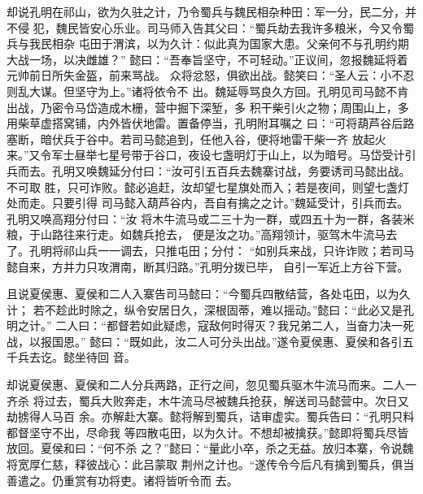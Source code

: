 却说孔明在祁山，欲为久驻之计，乃令蜀兵与魏民相杂种田：军一分，民二分，并不侵
犯，魏民皆安心乐业。司马师入告其父曰：“蜀兵劫去我许多粮米，今又令蜀兵与我民相杂
屯田于渭滨，以为久计：似此真为国家大患。父亲何不与孔明约期大战一场，以决雌雄？”
懿曰：“吾奉旨坚守，不可轻动。”正议间，忽报魏延将着元帅前日所失金盔，前来骂战。
众将忿怒，俱欲出战。懿笑曰：“圣人云：小不忍则乱大谋。但坚守为上。”诸将依令不
出。魏延辱骂良久方回。孔明见司马懿不肯出战，乃密令马岱造成木栅，营中掘下深堑，多
积干柴引火之物；周围山上，多用柴草虚搭窝铺，内外皆伏地雷。置备停当，孔明附耳嘱之
曰：“可将葫芦谷后路塞断，暗伏兵于谷中。若司马懿追到，任他入谷，便将地雷干柴一齐
放起火来。”又令军士昼举七星号带于谷口，夜设七盏明灯于山上，以为暗号。马岱受计引
兵而去。孔明又唤魏延分付曰：“汝可引五百兵去魏寨讨战，务要诱司马懿出战。不可取
胜，只可诈败。懿必追赶，汝却望七星旗处而入；若是夜间，则望七盏灯处而走。只要引得
司马懿入葫芦谷内，吾自有擒之之计。”魏延受计，引兵而去。孔明又唤高翔分付曰：“汝
将木牛流马或二三十为一群，或四五十为一群，各装米粮，于山路往来行走。如魏兵抢去，
便是汝之功。”高翔领计，驱驾木牛流马去了。孔明将祁山兵一一调去，只推屯田；分付：
“如别兵来战，只许诈败；若司马懿自来，方并力只攻渭南，断其归路。”孔明分拨已毕，
自引一军近上方谷下营。

且说夏侯惠、夏侯和二人入寨告司马懿曰：“今蜀兵四散结营，各处屯田，以为久计；
若不趁此时除之，纵令安居日久，深根固蒂，难以摇动。”懿曰：“此必又是孔明之计。”
二人曰：“都督若如此疑虑，寇敌何时得灭？我兄弟二人，当奋力决一死战，以报国恩。”
懿曰：“既如此，汝二人可分头出战。”遂令夏侯惠、夏侯和各引五千兵去讫。懿坐待回
音。

却说夏侯惠、夏侯和二人分兵两路，正行之间，忽见蜀兵驱木牛流马而来。二人一齐杀
将过去，蜀兵大败奔走，木牛流马尽被魏兵抢获，解送司马懿营中。次日又劫掳得人马百
余。亦解赴大寨。懿将解到蜀兵，诘审虚实。蜀兵告曰：“孔明只料都督坚守不出，尽命我
等四散屯田，以为久计。不想却被擒获。”懿即将蜀兵尽皆放回。夏侯和曰：“何不杀
之？”懿曰：“量此小卒，杀之无益。放归本寨，令说魏将宽厚仁慈，释彼战心：此吕蒙取
荆州之计也。“遂传令今后凡有擒到蜀兵，俱当善遣之。仍重赏有功将吏。诸将皆听令而
去。

